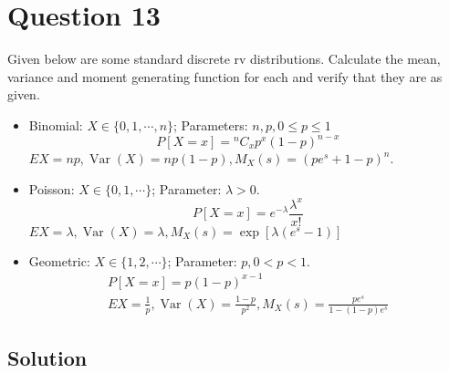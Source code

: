 \section*{Question 13}

Given below are some standard discrete rv distributions.
Calculate the mean, variance and moment generating function for each and verify that they are as given.
\begin{itemize}
    \item Binomial: \( X \in \{ 0,1, \cdots, n \} \);
          Parameters: \( n, p, 0 \leq p \leq 1 \)
          \begin{equation*}
              P[X=x]={ }^{n} C_{x} p^{x}(1-p)^{n-x}
          \end{equation*}
          \( E X=n p, \operatorname{Var}(X)=n p(1-p), M_{X}(s)=\left(p e^{s}+1-p\right)^{n} \).

    \item Poisson: \( X \in\{0,1, \cdots\} \);
          Parameter: \( \lambda>0 \).
          \begin{equation*}
              P[X=x]=e^{-\lambda} \frac{\lambda^{x}}{x!}
          \end{equation*}
          \( E X=\lambda, \operatorname{Var}(X)=\lambda, M_{X}(s)=\exp \left[\lambda\left(e^{s}-1\right)\right] \)

    \item Geometric: \( X \in\{1,2, \cdots\} \);
          Parameter: \( p, 0<p<1 \).
          \begin{equation*}
              \begin{array}{r}
                  P[X=x]=p(1-p)^{x-1} \\
                  E X=\frac{1}{p}, \operatorname{Var}(X)=\frac{1-p}{p^{2}}, M_{X}(s)=\frac{p e^{s}}{1-(1-p) e^{s}}
              \end{array}
          \end{equation*}
\end{itemize}

\subsection*{Solution}
